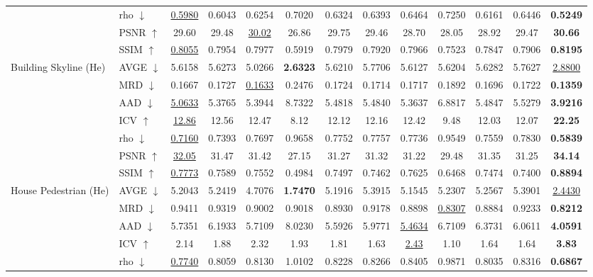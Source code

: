 \begin{table}[t]
{\begin{tabular}{llccccccccccc}
 & rho $\downarrow$ & \underline{0.5980} & 0.6043 & 0.6254 & 0.7020 & 0.6324 & 0.6393 & 0.6464 & 0.7250 & 0.6161 & 0.6446 & \textbf{0.5249} \\
 & PSNR $\uparrow$ & 29.60 & 29.48 & \underline{30.02} & 26.86 & 29.75 & 29.46 & 28.70 & 28.05 & 28.92 & 29.47 & \textbf{30.66} \\
 & SSIM $\uparrow$ & \underline{0.8055} & 0.7954 & 0.7977 & 0.5919 & 0.7979 & 0.7920 & 0.7966 & 0.7523 & 0.7847 & 0.7906 & \textbf{0.8195} \\
\midrule
\multirow{7}{*}{Building Skyline (He)} & AVGE $\downarrow$ & 5.6158 & 5.6273 & 5.0266 & \textbf{2.6323} & 5.6210 & 5.7706 & 5.6127 & 5.6204 & 5.6282 & 5.7627 & \underline{2.8800} \\
 & MRD $\downarrow$ & 0.1667 & 0.1727 & \underline{0.1633} & 0.2476 & 0.1724 & 0.1714 & 0.1717 & 0.1892 & 0.1696 & 0.1722 & \textbf{0.1359} \\
 & AAD $\downarrow$ & \underline{5.0633} & 5.3765 & 5.3944 & 8.7322 & 5.4818 & 5.4840 & 5.3637 & 6.8817 & 5.4847 & 5.5279 & \textbf{3.9216} \\
 & ICV $\uparrow$ & \underline{12.86} & 12.56 & 12.47 & 8.12 & 12.12 & 12.16 & 12.42 & 9.48 & 12.03 & 12.07 & \textbf{22.25} \\
 & rho $\downarrow$ & \underline{0.7160} & 0.7393 & 0.7697 & 0.9658 & 0.7752 & 0.7757 & 0.7736 & 0.9549 & 0.7559 & 0.7830 & \textbf{0.5839} \\
 & PSNR $\uparrow$ & \underline{32.05} & 31.47 & 31.42 & 27.15 & 31.27 & 31.32 & 31.22 & 29.48 & 31.35 & 31.25 & \textbf{34.14} \\
 & SSIM $\uparrow$ & \underline{0.7773} & 0.7589 & 0.7552 & 0.4984 & 0.7497 & 0.7462 & 0.7625 & 0.6468 & 0.7474 & 0.7400 & \textbf{0.8894} \\
\midrule
\multirow{7}{*}{House Pedestrian (He)} & AVGE $\downarrow$ & 5.2043 & 5.2419 & 4.7076 & \textbf{1.7470} & 5.1916 & 5.3915 & 5.1545 & 5.2307 & 5.2567 & 5.3901 & \underline{2.4430} \\
 & MRD $\downarrow$ & 0.9411 & 0.9319 & 0.9002 & 0.9018 & 0.8930 & 0.9178 & 0.8898 & \underline{0.8307} & 0.8884 & 0.9233 & \textbf{0.8212} \\
 & AAD $\downarrow$ & 5.7351 & 6.1933 & 5.7109 & 8.0230 & 5.5926 & 5.9771 & \underline{5.4634} & 6.7109 & 6.3731 & 6.0611 & \textbf{4.0591} \\
 & ICV $\uparrow$ & 2.14 & 1.88 & 2.32 & 1.93 & 1.81 & 1.63 & \underline{2.43} & 1.10 & 1.64 & 1.64 & \textbf{3.83} \\
 & rho $\downarrow$ & \underline{0.7740} & 0.8059 & 0.8130 & 1.0102 & 0.8228 & 0.8266 & 0.8405 & 0.9871 & 0.8035 & 0.8316 & \textbf{0.6867} \\

\end{tabular}}
\end{table}
